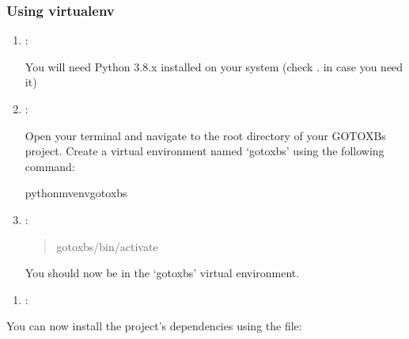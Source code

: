 \documentclass[letterpaper,10pt,english]{sphinxmanual}
\begin{document}
\subsubsection{Using virtualenv}
\label{\detokenize{quick_start:using-virtualenv}}\begin{enumerate}
%
\item {} 
\sphinxAtStartPar
{}:

\sphinxAtStartPar
You will need Python 3.8.x installed on your system (check . in case you need it)

\item {} 
\sphinxAtStartPar
{}:

\sphinxAtStartPar
Open your terminal and navigate to the root directory of your GOTO\sphinxhyphen{}XBs project. Create a virtual environment named ‘goto\sphinxhyphen{}xbs’ using the following command:

\begin{sphinxVerbatim}[commandchars=\\\{\}]
python\PYGZhy{}mvenvgoto\PYGZhy{}xbs
\end{sphinxVerbatim}

\item {} 
\sphinxAtStartPar
{}:
\begin{quote}

\begin{sphinxVerbatim}[commandchars=\\\{\}]
goto\PYGZhy{}xbs/bin/activate
\end{sphinxVerbatim}
\end{quote}

\sphinxAtStartPar
You should now be in the ‘goto\sphinxhyphen{}xbs’ virtual environment.

\end{enumerate}
\begin{enumerate}
%
\setcounter{enumi}{2}
\item {} 
\sphinxAtStartPar
{}:

\end{enumerate}

\sphinxAtStartPar
You can now install the project’s dependencies using the  file:
\end{document}
